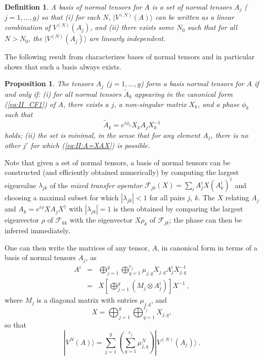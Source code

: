 \documentclass[rmp,aps,reprint,superscriptaddress,nobalancelastpage]{revtex4-1}
\newcommand{\be}{\begin{equation}}
\newcommand{\ee}{\end{equation}}
\newcommand{\bea}{\begin{eqnarray}}
\newcommand{\eea}{\end{eqnarray}}
\newtheorem{prop}[thm]{Proposition}
\newtheorem{defn}[thm]{Definition}
\newcommand{\ket}[1]{\vert#1\rangle}
\begin{document}
    \begin{defn}
        \label{def:4:BNT}
        A \emph{basis of normal tensors} for $A$ is a set of normal tensors
        $A_j$ ($j=1,\ldots,g$) so that (i) for each $N$, $\ket{V^{(N)}(A)}$ can be written as a linear combination of $V^{(N)}(A_j)$, and (ii) there exists some $N_0$ such that for all $N>N_0$, the $\ket{V^{(N)}(A_j)}$ are linearly independent.
    \end{defn}
    The following result from \textcite{cirac:mpdo-rgfp} characterizes bases of normal tensors and in particular shows that such a basis always exists.
    \begin{prop}\label{prop:char-BNT}
        The tensors $A_j$ ($j=1,\ldots,g$) form a basis normal tensors for $A$ if and only if: (i) for all normal tensors $\tilde A_k$ appearing in the canonical form (\ref{eq:II_CF1}) of $A$, there exists a $j$, a non-singular matrix $X_k$, and a phase $\phi_k$ such that
        \be
            \label{eq:II:A=XAX}
            \tilde A_k = e^{i\phi_k} X_k A_j X_k^{-1}
        \ee
        holds; (ii) the set is minimal, in the sense that for any element $A_j$, there is no other $j'$ for which (\ref{eq:II:A=XAX}) is possible.
    \end{prop}
    Note that given a set of normal tensors, a basis of normal tensors can be constructed (and efficiently obtained numerically) by computing the largest eigenvalue $\lambda_{jk}$ of
    the \emph{mixed transfer operator}  $\mathcal F_{jk}(X)=\sum_i A_j^i X (A_k^i)^\dagger$ and choosing a maximal subset for which $|\lambda_{jk}|<1$ for all pairs $j$, $k$. The $X$ relating $A_j$ and $A_k=e^{i\phi}XA_jX^\dagger$ with $|\lambda_{jk}|=1$ is then obtained by comparing the largest eigenvector $\rho$ of $\mathcal F_{kk}$ with the eigenvector $X\rho_k$ of $\mathcal F_{jk}$; the phase can then be inferred immediately.


    One can then write the matrices of any tensor, $A$, in canonical form in terms of a basis of normal tensors $A_j$, as
    \begin{subequations}
        \bea
            \label{eq:II_ABasicTensors}
            A^i &=&
            \bigoplus_{j=1}^g \bigoplus_{q=1}^{r_j} \mu_{j,q} X_{j,q} A^i_j X_{j,q}^{-1}
            \\
            &=&
            X \left[\bigoplus_{j=1}^g \left(M_j \otimes A^i_j\right)\right] X^{-1} \ ,
        \eea
    \end{subequations}
    where $M_j$ is a diagonal matrix with entries $\mu_{j,q}$,
    and
    \be
        \label{eq:II_X}
        X= \bigoplus_{j=1}^g \bigoplus_{q=1}^{r_j} X_{j,q},
    \ee
    so that
    \be
        \label{decBSV}
        |V^{N}(A)\rangle = \sum_{j=1}^g \left(\sum_{q=1}^{r_j} \mu_{j,q}^N \right) |V^{(N)}(A_j)\rangle\ .
    \ee
\end{document}
